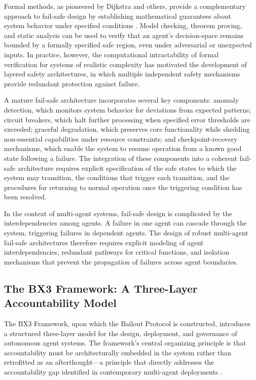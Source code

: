 Formal methods, as pioneered by Dijkstra and others, provide a complementary approach to fail-safe design by establishing mathematical guarantees about system behavior under specified conditions \cite{dijkstra1982}. Model checking, theorem proving, and static analysis can be used to verify that an agent's decision-space remains bounded by a formally specified safe region, even under adversarial or unexpected inputs. In practice, however, the computational intractability of formal verification for systems of realistic complexity has motivated the development of layered safety architectures, in which multiple independent safety mechanisms provide redundant protection against failure.

A mature fail-safe architecture incorporates several key components: anomaly detection, which monitors system behavior for deviations from expected patterns; circuit breakers, which halt further processing when specified error thresholds are exceeded; graceful degradation, which preserves core functionality while shedding non-essential capabilities under resource constraints; and checkpoint-recovery mechanisms, which enable the system to resume operation from a known good state following a failure. The integration of these components into a coherent fail-safe architecture requires explicit specification of the safe states to which the system may transition, the conditions that trigger each transition, and the procedures for returning to normal operation once the triggering condition has been resolved.

In the context of multi-agent systems, fail-safe design is complicated by the interdependencies among agents. A failure in one agent can cascade through the system, triggering failures in dependent agents. The design of robust multi-agent fail-safe architectures therefore requires explicit modeling of agent interdependencies, redundant pathways for critical functions, and isolation mechanisms that prevent the propagation of failures across agent boundaries.

\subsection{The BX3 Framework: A Three-Layer Accountability Model}

The BX3 Framework, upon which the Bailout Protocol is constructed, introduces a structured three-layer model for the design, deployment, and governance of autonomous agent systems. The framework's central organizing principle is that accountability must be architecturally embedded in the system rather than retrofitted as an afterthought—a principle that directly addresses the accountability gap identified in contemporary multi-agent deployments \cite{bansal2019}.

